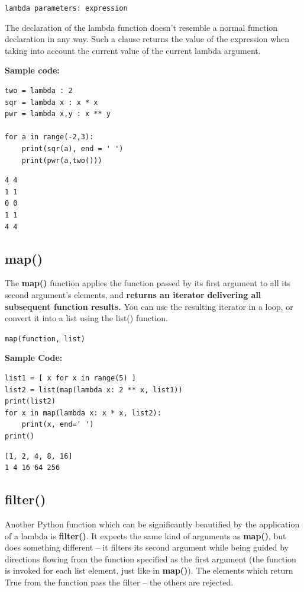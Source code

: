 \documentclass[11pt]{article}
\begin{document}
\texttt{lambda parameters: expression}

The declaration of the lambda function doesn’t resemble a normal
function declaration in any way.  Such a clause returns the value of
the expression when taking into account the current value of the
current lambda argument.

\vspace{10 mm}

\textbf{Sample code:}

\begin{verbatim}
two = lambda : 2
sqr = lambda x : x * x
pwr = lambda x,y : x ** y

for a in range(-2,3):
	print(sqr(a), end = ' ')
	print(pwr(a,two()))
\end{verbatim}

\begin{verbatim}
4 4
1 1
0 0
1 1
4 4
\end{verbatim}
\subsection{map()}
\label{sec:orgd7c4a66}
The \textbf{map()} function applies the function passed by its first argument
to all its second argument’s elements, and \textbf{returns an iterator}
\textbf{delivering all subsequent function results.} You can use the resulting
iterator in a loop, or convert it into a list using the list()
function.

\texttt{map(function, list)}

\textbf{Sample Code:}

\begin{verbatim}
list1 = [ x for x in range(5) ]
list2 = list(map(lambda x: 2 ** x, list1))
print(list2)
for x in map(lambda x: x * x, list2):
	print(x, end=' ')
print()
\end{verbatim}

\begin{verbatim}
[1, 2, 4, 8, 16]
1 4 16 64 256 
\end{verbatim}
\subsection{filter()}
\label{sec:orgbc2fd62}
Another Python function which can be significantly beautified by the
application of a lambda is \textbf{filter()}. It expects the same kind of
arguments as \textbf{map()}, but does something different – it filters its
second argument while being guided by directions flowing from the
function specified as the first argument (the function is invoked for
each list element, just like in \textbf{map()}).  The elements which return
True from the function pass the filter – the others are rejected.
\end{document}
